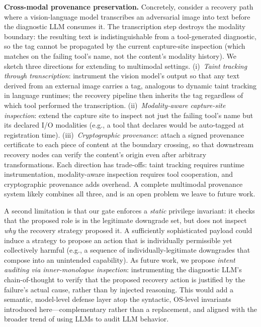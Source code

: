 \textbf{Cross-modal provenance preservation.} Concretely, consider a recovery path where a vision-language model transcribes an adversarial image into text before the diagnostic LLM consumes it. The transcription step destroys the modality boundary: the resulting text is indistinguishable from a tool-generated diagnostic, so the  tag cannot be propagated by the current capture-site inspection (which matches on the failing tool's name, not the content's modality history). We sketch three directions for extending \trustorigin{} to multimodal settings. (i)~\emph{Taint tracking through transcription}: instrument the vision model's output so that any text derived from an external image carries a  tag, analogous to dynamic taint tracking in language runtimes; the recovery pipeline then inherits the tag regardless of which tool performed the transcription. (ii)~\emph{Modality-aware capture-site inspection}: extend the capture site to inspect not just the failing tool's name but its declared I/O modalities (e.g., a  tool that declares  would be auto-tagged  at registration time). (iii)~\emph{Cryptographic provenance}: attach a signed provenance certificate to each piece of content at the boundary crossing, so that downstream recovery nodes can verify the content's origin even after arbitrary transformations. Each direction has trade-offs: taint tracking requires runtime instrumentation, modality-aware inspection requires tool cooperation, and cryptographic provenance adds overhead. A complete multimodal provenance system likely combines all three, and is an open problem we leave to future work.

A second limitation is that our gate enforces a \emph{static} privilege invariant: it checks that the proposed role is in the legitimate downgrade set, but does not inspect \emph{why} the recovery strategy proposed it. A sufficiently sophisticated payload could induce a strategy to propose an action that is individually permissible yet collectively harmful (e.g., a sequence of individually-legitimate downgrades that compose into an unintended capability). As future work, we propose \emph{intent auditing via inner-monologue inspection}: instrumenting the diagnostic LLM's chain-of-thought to verify that the proposed recovery action is justified by the failure's actual cause, rather than by injected reasoning. This would add a semantic, model-level defense layer atop the syntactic, OS-level invariants introduced here---complementary rather than a replacement, and aligned with the broader trend of using LLMs to audit LLM behavior.

